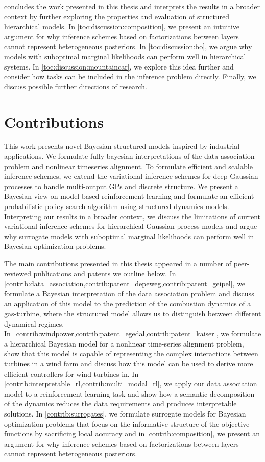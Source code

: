  concludes the work presented in this thesis and interprets the results in a broader context by further exploring the properties and evaluation of structured hierarchical models.
In \cref{toc:discussion:composition}, we present an intuitive argument for why inference schemes based on factorizations between layers cannot represent heterogeneous posteriors.
In \cref{toc:discussion:bo}, we argue why models with suboptimal marginal likelihoods can perform well in hierarchical systems.
In \cref{toc:discussion:mountaincar}, we explore this idea further and consider how tasks can be included in the inference problem directly.
Finally, we discuss possible further directions of research.


\section{Contributions}
This work presents novel Bayesian structured models inspired by industrial applications.
We formulate fully bayesian interpretations of the data association problem and nonlinear timeseries alignment.
To formulate efficient and scalable inference schemes, we extend the variational inference schemes for deep Gaussian processes to handle multi-output GPs and discrete structure.
We present a Bayesian view on model-based reinforcement learning and formulate an efficient probabilistic policy search algorithm using structured dynamics models.
Interpreting our results in a broader context, we discuss the limitations of current variational inference schemes for hierarchical Gaussian process models and argue why surrogate models with suboptimal marginal likelihoods can perform well in Bayesian optimization problems.

The main contributions presented in this thesis appeared in a number of peer-reviewed publications and patents we outline below.
In \cref{contrib:data_association,contrib:patent_depeweg,contrib:patent_geipel}, we formulate a Bayesian interpretation of the data association problem and discuss an application of this model to the prediction of the combustion dynamics of a gas-turbine, where the structured model allows us to distinguish between different dynamical regimes.
In~\cref{contrib:windpower,contrib:patent_egedal,contrib:patent_kaiser}, we formulate a hierarchical Bayesian model for a nonlinear time-series alignment problem, show that this model is capable of representing the complex interactions between turbines in a wind farm and discuss how this model can be used to derive more efficient controllers for wind-turbines in.
In \cref{contrib:interpretable_rl,contrib:multi_modal_rl}, we apply our data association model to a reinforcement learning task and show how a semantic decomposition of the dynamics reduces the data requirements and produces interpretable solutions.
In \cref{contrib:surrogates}, we formulate surrogate models for Bayesian optimization problems that focus on the informative structure of the objective functions by sacrificing local accuracy and in \cref{contrib:composition}, we present an argument for why inference schemes based on factorizations between layers cannot represent heterogeneous posteriors.


